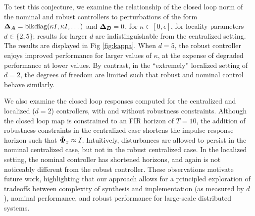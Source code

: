 To test this conjecture, we examine the relationship of the closed loop norm of the nominal and robust controllers to perturbations of the form ${\boldsymbol{\Delta}}_{\boldsymbol{A}} = \mathrm{blkdiag}(\kappa I, \kappa I, \dots)$ and ${\boldsymbol{\Delta}}_{\boldsymbol{B}} = 0$, for $\kappa \in [0,\epsilon]$, for locality parameters $d\in\{2,5\}$; results for larger $d$ are indistinguishable from the centralized setting. The results are displayed in Fig \ref{fig:kappa}.  When $d=5$, the robust controller enjoys improved performance for larger values of $\kappa$, at the expense of degraded performance at lower values. By contrast, in the ``extremely'' localized setting of $d=2$, the degrees of freedom are limited such that robust and nominal control behave similarly.  

We also examine the closed loop responses computed for the centralized and localized ($d=2$) controllers, with and without robustness constraints. Although the closed loop map is constrained to an FIR horizon of $T=10$, the addition of robustness constraints in the centralized case shortens the impulse response horizon such that $\hat{\boldsymbol{\Phi}}_x \approx I$. Intuitively, disturbances are allowed to persist in the nominal centralized case, but not in the robust centralized case. In the localized setting, the nominal controller has shortened horizons, and again is not noticeably different from the robust controller. These observations motivate future work, highlighting that our approach allows for a principled exploration of tradeoffs between complexity of synthesis and implementation (as measured by $d$), nominal performance, and robust performance for large-scale distributed systems.

